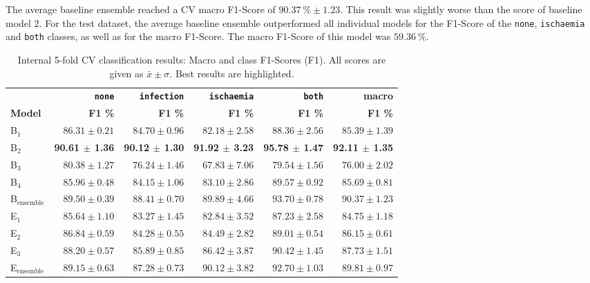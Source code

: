 \documentclass[runningheads]{llncs}
\begin{document}
The average baseline ensemble reached a CV macro F1-Score of $90.37~\% \pm 1.23$. This result was slightly worse than the score of baseline model 2. For the test dataset, the average baseline ensemble outperformed all individual models for the F1-Score of the \texttt{none}, \texttt{ischaemia} and \texttt{both} classes, as well as for the macro F1-Score. The macro F1-Score of this model was $59.36~\%$.


\begin{table}[ht!]
	\begin{center}
		\caption{Internal 5-fold CV classification results: Macro and class F1-Scores (F1). All scores are given as $\bar{x} \pm \sigma$. Best results are highlighted.}\label{tab:internal_results}
		\begin{tabularx}{\textwidth}{|X|r|r|r|r|r|}
			\hline
			\textbf{}
			& \textbf{\texttt{none}} & \textbf{\texttt{infection}} & \textbf{\texttt{ischaemia}} & \textbf{\texttt{both}}&\textbf{macro} \\
			\textbf{Model}
			& \textbf{F1 \%} & \textbf{F1 \%} & \textbf{F1 \%} & \textbf{F1 \%} & \textbf{F1 \%}\\
			\hline\hline
			B$_1$ & $86.31 \pm 0.21$&$84.70 \pm 0.96$&$82.18 \pm 2.58$&$88.36 \pm 2.56$&$85.39 \pm 1.39$\\
			B$_2$ &\textbf{90.61 $\pm$ 1.36}&\textbf{90.12 $\pm$ 1.30}& \textbf{91.92 $\pm$ 3.23}&\textbf{95.78 $\pm$ 1.47}&\textbf{92.11 $\pm$ 1.35}\\
			B$_3$ &$80.38 \pm 1.27$&$76.24 \pm 1.46$&$67.83 \pm 7.06$&$79.54 \pm 1.56$&$76.00 \pm 2.02$\\
			B$_4$ &$85.96 \pm 0.48$&$84.15 \pm 1.06$&$83.10 \pm 2.86$&$89.57 \pm 0.92$&$85.69 \pm 0.81$\\\hline
			B$_\text{ensemble}$ & $89.50 \pm 0.39$&$88.41 \pm 0.70$&$89.89 \pm 4.66$&$93.70 \pm 0.78$&$90.37 \pm 1.23$\\\hline\hline
			E$_1$ & $85.64 \pm 1.10$&$83.27 \pm 1.45$&$82.84 \pm 3.52$&$87.23 \pm 2.58$&$84.75 \pm 1.18$\\
			E$_2$ & $86.84 \pm 0.59$&$84.28 \pm 0.55$&$84.49 \pm 2.82$&$89.01 \pm 0.54$&$86.15 \pm 0.61$\\
			E$_3$ &$88.20 \pm 0.57$&$85.89 \pm 0.85$&$86.42 \pm 3.87$&$90.42 \pm 1.45$&$87.73 \pm 1.51$\\\hline
			E$_\text{ensemble}$ & $89.15 \pm 0.63$&$87.28 \pm 0.73$&$90.12 \pm 3.82$&$92.70 \pm 1.03$&$89.81 \pm 0.97$\\
			\hline
		\end{tabularx}		
	\end{center}
\end{table}
\end{document}
